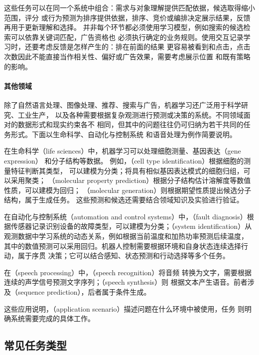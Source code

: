 这些任务可以在同一个系统中组合：需求与对象理解提供匹配依据，候选取得缩小范围，评分
或行为预测为排序提供依据，排序、竞价或编排决定展示结果，反馈再用于更新理解和选择。
并非每个环节都必须使用学习模型，例如搜索的候选检索可以依靠关键词匹配，广告资格也
必须执行确定的业务规则。使用交互记录学习时，还要考虑反馈是怎样产生的：排在前面的结果
更容易被看到和点击，点击次数因此不能直接当作相关性、偏好或广告效果，需要考虑展示位置
和既有策略的影响。

\paragraph{其他领域}
除了自然语言处理、图像处理、推荐、搜索与广告，机器学习还广泛用于科学研究、工业生产，
以及各种需要根据复杂观测进行预测或决策的系统。不同领域面对的数据形式和现实约束各不
相同，但其中的问题往往仍可归纳为若干共同的任务形式。下面以生命科学、自动化与控制系统
和语音处理为例作简要说明。

在生命科学（life sciences）中，机器学习可以处理细胞测量、基因表达（gene expression）
和分子结构等数据。
例如，（cell type identification）根据细胞的测量特征判断其类型，
可以建模为分类；将具有相似基因表达模式的细胞归组，可以采用聚类；
（molecular property prediction）根据分子结构估计溶解度等数值性质，可以建模为回归；
（molecular generation）则根据期望性质提出候选分子结构，属于生成任务。
这些预测和候选还需要结合领域知识及实验进行验证。

在自动化与控制系统（automation and control systems）中，（fault
diagnosis）根据传感器记录识别设备的故障类型，可以建模为分类；（system
identification）从观测数据中学习系统的动态关系，例如根据当前温度和加热功率预测后续温度，
其中的数值预测可以采用回归。机器人控制需要根据环境和自身状态连续选择行动，属于序贯
决策；它可以结合感知、状态预测和行动选择等多个任务。

在（speech processing）中，（speech recognition）将音频
转换为文字，需要根据连续的声学信号预测文字序列；（speech synthesis）则
根据文本产生语音。前者涉及（sequence prediction），后者属于条件生成。

这些应用说明，（application scenario）描述问题在什么环境中被使用，任务
则明确系统需要完成的具体工作。

\subsection{常见任务类型}

